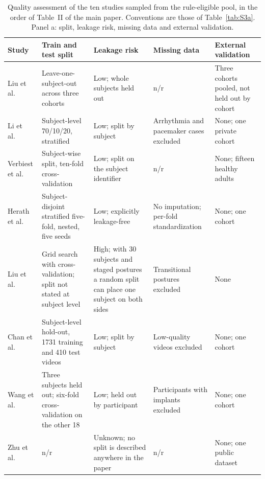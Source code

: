 \documentclass[journal]{IEEEtran}
\renewcommand{\thetable}{S\arabic{table}}
\begin{document}
\begin{table}[tbp]
\centering
\renewcommand{\thetable}{S5a}
\caption{Quality assessment of the ten studies sampled from the rule-eligible pool, in the order of
Table~II of the main paper. Conventions are those of Table~\ref{tab:S3a}. Panel a: split, leakage risk, missing data and external validation.}
\label{tab:S5a}
\footnotesize
\setlength{\tabcolsep}{2.5pt}
\renewcommand{\arraystretch}{1.05}
\begin{tabularx}{\textwidth}{L{2.6cm} L{3.6cm} L{3.2cm} L{3.4cm} X}
\toprule
\textbf{Study} & \textbf{Train and test split} & \textbf{Leakage risk} & \textbf{Missing data} & \textbf{External validation} \\
\midrule
Liu et al.~\cite{liu2024cignn} & Leave-one-subject-out across three cohorts & Low; whole subjects held out & n/r & Three cohorts pooled, not held out by cohort \\
\addlinespace[1pt]
Li et al.~\cite{li2026edgeischemia} & Subject-level 70/10/20, stratified & Low; split by subject & Arrhythmia and pacemaker cases excluded & None; one private cohort \\
\addlinespace[1pt]
Verbiest et al.~\cite{verbiest2023gaitstride} & Subject-wise split, ten-fold cross-validation & Low; split on the subject identifier & n/r & None; fifteen healthy adults \\
\addlinespace[1pt]
Herath et al.~\cite{herath2026parkinson} & Subject-disjoint stratified five-fold, nested, five seeds & Low; explicitly leakage-free & No imputation; per-fold standardization & None; one cohort \\
\addlinespace[1pt]
Liu et al.~\cite{liu2025sleepposture} & Grid search with cross-validation; split not stated at subject level & High; with 30 subjects and staged postures a random split can place one subject on both sides & Transitional postures excluded & None \\
\addlinespace[1pt]
Chan et al.~\cite{chan2026sitstand} & Subject-level hold-out, 1731 training and 410 test videos & Low; split by subject & Low-quality videos excluded & None; one cohort \\
\addlinespace[1pt]
Wang et al.~\cite{wang2025vo2} & Three subjects held out; six-fold cross-validation on the other 18 & Low; held out by participant & Participants with implants excluded & None; one cohort \\
\addlinespace[1pt]
Zhu et al.~\cite{zhu2024ippg} & n/r & Unknown; no split is described anywhere in the paper & n/r & None; one public dataset \\

\end{tabularx}
\end{table}
\end{document}
